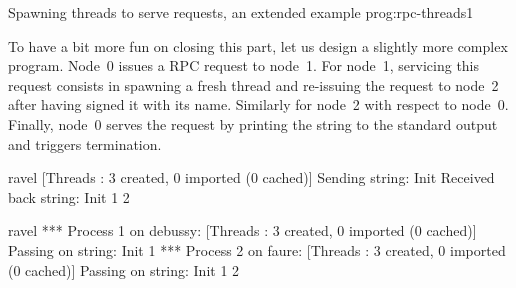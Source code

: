  {Spawning threads to serve
  requests, an extended example} {prog:rpc-threads1}

To have a bit more fun on closing this part, let us design a slightly
more complex program. Node~0 issues a RPC request to node~1. For
node~1, servicing this request consists in spawning a fresh thread and
re-issuing the request to node~2 after having signed it with its
name.  Similarly for node~2 with respect to node~0. Finally, node~0
serves the request by printing the string to the standard output and
triggers termination.

\begin{shell}
ravel%
[Threads : 3 created, 0 imported (0 cached)]
Sending string: Init
Received back string: Init 1 2

ravel%
*** Process 1 on debussy:
[Threads : 3 created, 0 imported (0 cached)]
Passing on string: Init 1
*** Process 2 on faure:
[Threads : 3 created, 0 imported (0 cached)]
Passing on string: Init 1 2
\end{shell}

